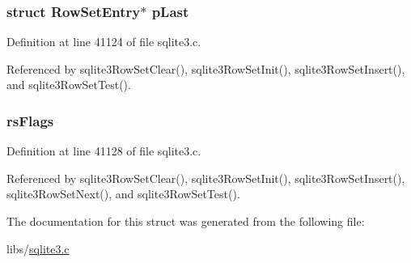 \hypertarget{struct_row_set_a55f1d815d176ed58e160a1af1203442c}{}
\subsubsection[{p\+Last}]{\setlength{\rightskip}{0pt plus 5cm}struct {\bf Row\+Set\+Entry}$\ast$ p\+Last}\label{struct_row_set_a55f1d815d176ed58e160a1af1203442c}


Definition at line 41124 of file sqlite3.\+c.



Referenced by sqlite3\+Row\+Set\+Clear(), sqlite3\+Row\+Set\+Init(), sqlite3\+Row\+Set\+Insert(), and sqlite3\+Row\+Set\+Test().

\hypertarget{struct_row_set_a54c0ccbe4d32bd0d5979e62d94956106}{}
\subsubsection[{rs\+Flags}]{ rs\+Flags}\label{struct_row_set_a54c0ccbe4d32bd0d5979e62d94956106}


Definition at line 41128 of file sqlite3.\+c.



Referenced by sqlite3\+Row\+Set\+Clear(), sqlite3\+Row\+Set\+Init(), sqlite3\+Row\+Set\+Insert(), sqlite3\+Row\+Set\+Next(), and sqlite3\+Row\+Set\+Test().



The documentation for this struct was generated from the following file\+:\begin{DoxyCompactItemize}
\item 
libs/\hyperlink{sqlite3_8c}{sqlite3.\+c}\end{DoxyCompactItemize}

